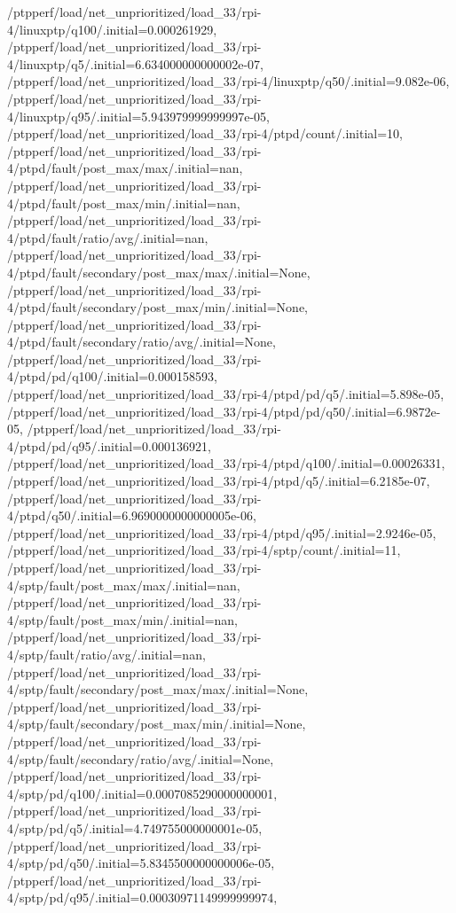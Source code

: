 {    /ptpperf/load/net_unprioritized/load_33/rpi-4/linuxptp/q100/.initial=0.000261929,
    /ptpperf/load/net_unprioritized/load_33/rpi-4/linuxptp/q5/.initial=6.634000000000002e-07,
    /ptpperf/load/net_unprioritized/load_33/rpi-4/linuxptp/q50/.initial=9.082e-06,
    /ptpperf/load/net_unprioritized/load_33/rpi-4/linuxptp/q95/.initial=5.943979999999997e-05,
    /ptpperf/load/net_unprioritized/load_33/rpi-4/ptpd/count/.initial=10,
    /ptpperf/load/net_unprioritized/load_33/rpi-4/ptpd/fault/post_max/max/.initial=nan,
    /ptpperf/load/net_unprioritized/load_33/rpi-4/ptpd/fault/post_max/min/.initial=nan,
    /ptpperf/load/net_unprioritized/load_33/rpi-4/ptpd/fault/ratio/avg/.initial=nan,
    /ptpperf/load/net_unprioritized/load_33/rpi-4/ptpd/fault/secondary/post_max/max/.initial=None,
    /ptpperf/load/net_unprioritized/load_33/rpi-4/ptpd/fault/secondary/post_max/min/.initial=None,
    /ptpperf/load/net_unprioritized/load_33/rpi-4/ptpd/fault/secondary/ratio/avg/.initial=None,
    /ptpperf/load/net_unprioritized/load_33/rpi-4/ptpd/pd/q100/.initial=0.000158593,
    /ptpperf/load/net_unprioritized/load_33/rpi-4/ptpd/pd/q5/.initial=5.898e-05,
    /ptpperf/load/net_unprioritized/load_33/rpi-4/ptpd/pd/q50/.initial=6.9872e-05,
    /ptpperf/load/net_unprioritized/load_33/rpi-4/ptpd/pd/q95/.initial=0.000136921,
    /ptpperf/load/net_unprioritized/load_33/rpi-4/ptpd/q100/.initial=0.00026331,
    /ptpperf/load/net_unprioritized/load_33/rpi-4/ptpd/q5/.initial=6.2185e-07,
    /ptpperf/load/net_unprioritized/load_33/rpi-4/ptpd/q50/.initial=6.9690000000000005e-06,
    /ptpperf/load/net_unprioritized/load_33/rpi-4/ptpd/q95/.initial=2.9246e-05,
    /ptpperf/load/net_unprioritized/load_33/rpi-4/sptp/count/.initial=11,
    /ptpperf/load/net_unprioritized/load_33/rpi-4/sptp/fault/post_max/max/.initial=nan,
    /ptpperf/load/net_unprioritized/load_33/rpi-4/sptp/fault/post_max/min/.initial=nan,
    /ptpperf/load/net_unprioritized/load_33/rpi-4/sptp/fault/ratio/avg/.initial=nan,
    /ptpperf/load/net_unprioritized/load_33/rpi-4/sptp/fault/secondary/post_max/max/.initial=None,
    /ptpperf/load/net_unprioritized/load_33/rpi-4/sptp/fault/secondary/post_max/min/.initial=None,
    /ptpperf/load/net_unprioritized/load_33/rpi-4/sptp/fault/secondary/ratio/avg/.initial=None,
    /ptpperf/load/net_unprioritized/load_33/rpi-4/sptp/pd/q100/.initial=0.0007085290000000001,
    /ptpperf/load/net_unprioritized/load_33/rpi-4/sptp/pd/q5/.initial=4.749755000000001e-05,
    /ptpperf/load/net_unprioritized/load_33/rpi-4/sptp/pd/q50/.initial=5.8345500000000006e-05,
    /ptpperf/load/net_unprioritized/load_33/rpi-4/sptp/pd/q95/.initial=0.00030971149999999974,
}

